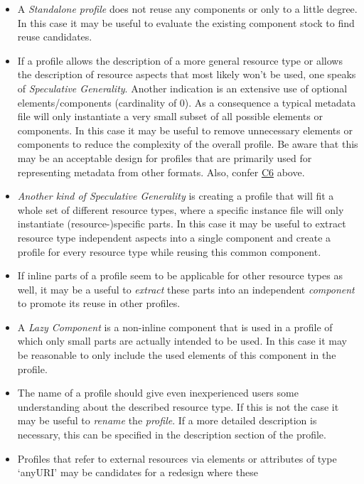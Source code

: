 \begin{itemize}
\tightlist
\item
  A \emph{Standalone profile} does not reuse any components or only to a
  little degree. In this case it may be useful to evaluate the existing
  component stock to find reuse candidates.
\item
  If a profile allows the description of a more general resource type or
  allows the description of resource aspects that most likely won't be
  used, one speaks of \emph{Speculative Generality}. Another indication
  is an extensive use of optional elements/components (cardinality of
  0). As a consequence a typical metadata file will only instantiate a
  very small subset of all possible elements or components. In this case
  it may be useful to remove unnecessary elements or components to
  reduce the complexity of the overall profile. Be aware that this may
  be an acceptable design for profiles that are primarily used for
  representing metadata from other formats. Also, confer
  \href{/modelling_component_metadata/components.md\#c6}{C6} above.
\item
  \emph{Another kind of Speculative Generality} is creating a profile
  that will fit a whole set of different resource types, where a
  specific instance file will only instantiate (resource-)specific
  parts. In this case it may be useful to extract resource type
  independent aspects into a single component and create a profile for
  every resource type while reusing this common component.
\item
  If inline parts of a profile seem to be applicable for other resource
  types as well, it may be a useful to \emph{extract} these parts into
  an independent \emph{component} to promote its reuse in other
  profiles.
\item
  A \emph{Lazy Component} is a non-inline component that is used in a
  profile of which only small parts are actually intended to be used. In
  this case it may be reasonable to only include the used elements of
  this component in the profile.
\item
  The name of a profile should give even inexperienced users some
  understanding about the described resource type. If this is not the
  case it may be useful to \emph{rename} the \emph{profile}. If a more
  detailed description is necessary, this can be specified in the
  description section of the profile.
\item
  Profiles that refer to external resources via elements or attributes
  of type `anyURI' may be candidates for a redesign where these

\end{itemize}
